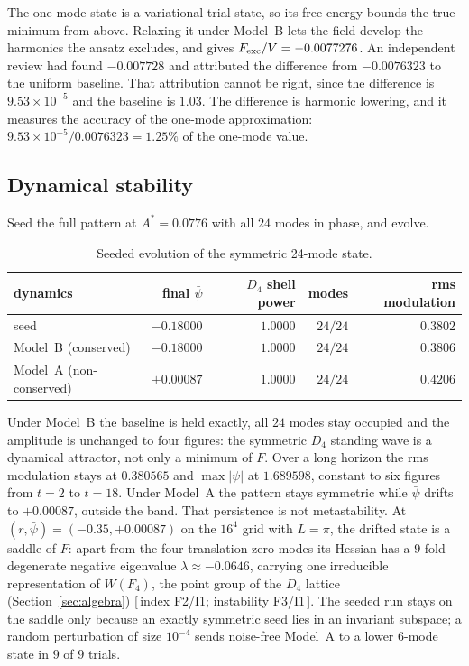 \documentclass[a4paper,11pt]{article}
\let\jsOldToprule\toprule
\renewcommand{\toprule}{\jsOldToprule\rowcolor{bgheader}}
\numberwithin{equation}{section}
\theoremstyle{jsplain}
\theoremstyle{jsrem}
\newcommand{\grade}[1]{[\,#1\,]}
\begin{document}
The one-mode state is a variational trial state, so its free energy bounds the true minimum from above. Relaxing it under Model~B lets the field develop the harmonics the ansatz excludes, and gives $F_{\rm exc}/V=-0.0077276$. An independent review had found $-0.007728$ and attributed the difference from $-0.0076323$ to the uniform baseline. That attribution cannot be right, since the difference is $9.53\times10^{-5}$ and the baseline is $1.03$. The difference is harmonic lowering, and it measures the accuracy of the one-mode approximation: $9.53\times10^{-5}/0.0076323=1.25\%$ of the one-mode value.

\subsection{Dynamical stability}

Seed the full pattern at $A^*=0.0776$ with all $24$ modes in phase, and evolve.

\begin{table}[htbp]
\centering
\begin{tabular}{lrrrr}
\toprule
dynamics & final $\bar\psi$ & $D_4$ shell power & modes & rms modulation\\
\midrule
seed & $-0.18000$ & $1.0000$ & $24/24$ & $0.3802$\\
Model~B (conserved) & $-0.18000$ & $1.0000$ & $24/24$ & $0.3806$\\
Model~A (non-conserved) & $+0.00087$ & $1.0000$ & $24/24$ & $0.4206$\\
\bottomrule
\end{tabular}
\caption{Seeded evolution of the symmetric 24-mode state.}
\label{tab:attractor}
\end{table}

Under Model~B the baseline is held exactly, all $24$ modes stay occupied and the amplitude is unchanged to four figures: the symmetric $D_4$ standing wave is a dynamical attractor, not only a minimum of $F$. Over a long horizon the rms modulation stays at $0.380565$ and $\max|\psi|$ at $1.689598$, constant to six figures from $t=2$ to $t=18$. Under Model~A the pattern stays symmetric while $\bar\psi$ drifts to $+0.00087$, outside the band. That persistence is not metastability. At $(r,\bar\psi)=(-0.35,+0.00087)$ on the $16^4$ grid with $L=\pi$, the drifted state is a saddle of $F$: apart from the four translation zero modes its Hessian has a $9$-fold degenerate negative eigenvalue $\lambda\approx-0.0646$, carrying one irreducible representation of $W(F_4)$, the point group of the $D_4$ lattice (Section~\ref{sec:algebra}) \grade{index F2/I1; instability F3/I1}. The seeded run stays on the saddle only because an exactly symmetric seed lies in an invariant subspace; a random perturbation of size $10^{-4}$ sends noise-free Model~A to a lower 6-mode state in $9$ of $9$ trials.
\end{document}

